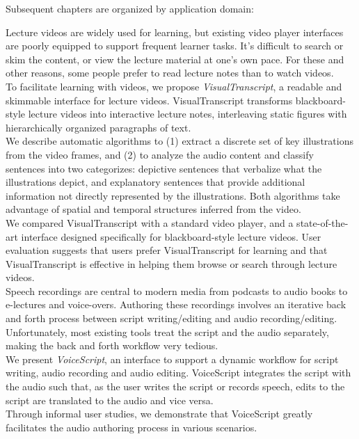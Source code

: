 Subsequent chapters are organized by application domain:
\begin{mldescription}
Lecture videos are widely used for learning, but existing
video player interfaces are poorly equipped to support frequent learner tasks. It's difficult to search or skim the content, or view the lecture material at one's own pace. For these and other reasons, some people prefer to read lecture notes than to watch videos.\\
To facilitate learning with videos, we propose \emph{VisualTranscript}, a readable and skimmable interface for lecture videos. VisualTranscript transforms blackboard-style lecture videos into interactive lecture notes, interleaving static figures with hierarchically organized paragraphs of text.\\
We describe automatic algorithms to (1) extract a discrete set of key illustrations from the video frames, and (2) to analyze the audio content and classify sentences into two categorizes: depictive sentences that verbalize what the illustrations depict, and explanatory sentences that provide additional information not directly represented by the illustrations. Both algorithms take advantage of spatial and temporal structures inferred from the video.\\
We compared VisualTranscript with a standard video player, and a state-of-the-art interface designed specifically for blackboard-style lecture videos. User evaluation suggests
that users prefer VisualTranscript for learning and that VisualTranscript is
effective in helping them browse or search through lecture videos.\\

Speech recordings are central to modern media from podcasts
to audio books to e-lectures and voice-overs. Authoring these
recordings involves an iterative back and forth process between
script writing/editing and audio recording/editing. Unfortunately, most
existing tools treat the script and the audio separately, making
the back and forth workflow very tedious.\\
We present \emph{VoiceScript}, an interface to support a dynamic workflow for script
writing, audio recording and audio editing. VoiceScript integrates the
script with the audio such that, as the user writes the script or
records speech, edits to the script are translated to the audio
and vice versa.\\
Through informal user studies, we demonstrate that VoiceScript greatly facilitates the audio authoring process in various scenarios.\\


\end{mldescription}
